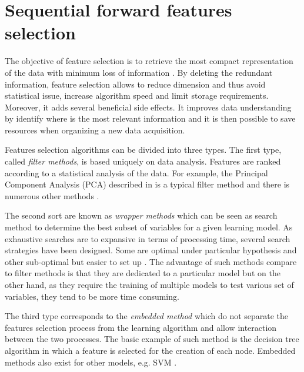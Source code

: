 \documentclass[journal,peerreview,onecolumn]{IEEEtran}
\begin{document}
\section{Sequential forward features selection}
\label{sec:selection}

The objective of feature selection is to retrieve the most compact representation of the data with minimum loss of information \cite{Guyon:2006:FEF:1208773}. By deleting the redundant information, feature selection allows to reduce dimension and thus avoid statistical issue, increase algorithm speed and limit storage requirements. Moreover, it adds several beneficial side effects. It improves data understanding by identify where is the most relevant information and it is then possible to save resources when organizing a new data acquisition.%

Features selection algorithms can be divided into three types. The first type, called \emph{filter methods}, is based uniquely on data analysis. Features are ranked according to a statistical analysis of the data. For example, the Principal Component Analysis (PCA) described in \cite{jimenez1998supervised} is a typical filter method and there is numerous other methods \cite{bruzzone1995extension,biesiada2007feature,demir2008phase}.

The second sort are known as \emph{wrapper methods} which can be seen as search method to determine the best subset of variables for a given learning model. As exhaustive searches are to expansive in terms of processing time, several search strategies have been designed. Some are optimal under particular hypothesis \cite{narendra1977branch} and other sub-optimal but easier to set up \cite{whitney1971direct,somol1999adaptive}. The advantage of such methods compare to filter methods is that they are dedicated to a particular model but on the other hand, as they require the training of multiple models to test various set of variables, they tend to be more time consuming.

The third type corresponds to the \emph{embedded method} which do not separate the features selection process from the learning algorithm and allow interaction between the two processes. The basic example of such method is the decision tree algorithm in which a feature is selected for the creation of each node. Embedded methods also exist for other models, e.g. SVM \cite{guyon2002gene,weston2003use}.
\end{document}
